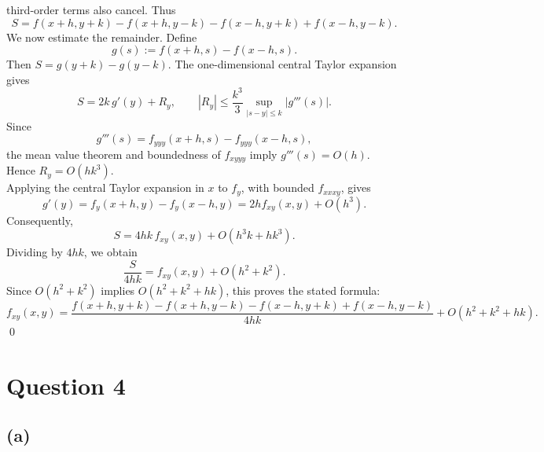 \documentclass{article}
\begin{document}
third-order terms also cancel. Thus
\[
S=f(x+h,y+k)-f(x+h,y-k)
  -f(x-h,y+k)+f(x-h,y-k).
\]
We now estimate the remainder. Define
\[
g(s):=f(x+h,s)-f(x-h,s).
\]
Then \(S=g(y+k)-g(y-k)\). The one-dimensional central Taylor
expansion gives
\[
S=2k\,g'(y)+R_y,\qquad
|R_y|\leq\frac{k^3}{3}
\sup_{|s-y|\leq k}|g'''(s)|.
\]
Since
\[
g'''(s)=f_{yyy}(x+h,s)-f_{yyy}(x-h,s),
\]
the mean value theorem and boundedness of \(f_{xyyy}\) imply
\(g'''(s)=O(h)\). Hence \(R_y=O(hk^3)\).\\
Applying the central Taylor expansion in \(x\) to \(f_y\), with
bounded \(f_{xxxy}\), gives
\[
g'(y)
=f_y(x+h,y)-f_y(x-h,y)
=2h f_{xy}(x,y)+O(h^3).
\]
Consequently,
\[
S=4hk\,f_{xy}(x,y)+O(h^3k+hk^3).
\]
Dividing by \(4hk\), we obtain
\[
\frac{S}{4hk}=f_{xy}(x,y)+O(h^2+k^2).
\]
Since \(O(h^2+k^2)\) implies \(O(h^2+k^2+hk)\), this proves
the stated formula:
\[
\boxed{
f_{xy}(x,y)=
\frac{
f(x+h,y+k)-f(x+h,y-k)
-f(x-h,y+k)+f(x-h,y-k)
}{4hk}
+O(h^2+k^2+hk).
}
\]
\qed
\section*{Question 4}
\subsection*{(a)}
\end{document}
